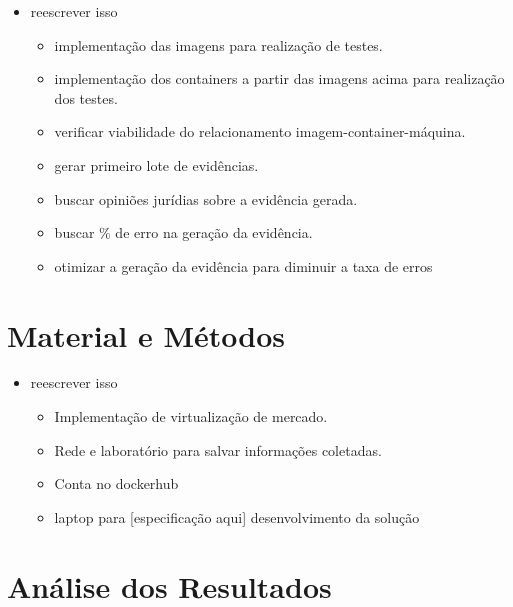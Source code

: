 \documentclass[
	12pt,				%
	openright,			%
	oneside,			%
	a4paper,			%
	english,			%
	french,				%
	spanish,			%
	brazil,				%
	]{abntex2}
\begin{document}
\begin{itemize}
 \item reescrever isso
 
 \begin{itemize}
  \item implementação das imagens para realização de testes.
  \item implementação dos containers a partir das imagens acima para realização dos testes.
  \item verificar viabilidade do relacionamento imagem-container-máquina.
  \item gerar primeiro lote de evidências.
  \item buscar opiniões jurídias sobre a evidência gerada.
  \item buscar \% de erro na geração da evidência.
  \item otimizar a geração da evidência para diminuir a taxa de erros
 \end{itemize}

\end{itemize}

\chapter{Material e Métodos}

\begin{itemize}
 \item reescrever isso
 
 \begin{itemize}
  \item Implementação de virtualização de mercado.
  \item Rede e laboratório para salvar informações coletadas.
  \item Conta no dockerhub
  \item laptop para [especificação aqui] desenvolvimento da solução
 \end{itemize}

\end{itemize}

\chapter{Análise dos Resultados}
\end{document}
